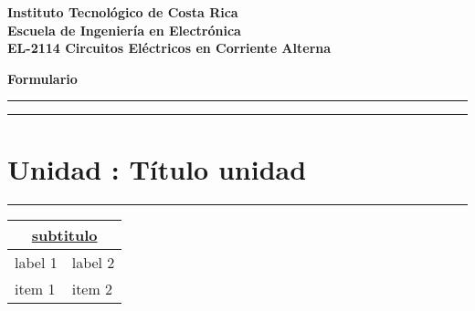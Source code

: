 \documentclass{article}
\begin{document}
\textbf{Instituto Tecnológico de Costa Rica \\
Escuela de Ingeniería en Electrónica \\
EL-2114 Circuitos Eléctricos en Corriente Alterna\\}
\begin{center}
\Huge
\textbf{Formulario}
\end{center}
\vspace{0.2in}
\hrule

\vspace{0.2in}
\hrule
\section{Unidad : Título unidad}
\hrule
\vspace{0.2in}
\begin{tabularx}{\textwidth}{|X|X|}
\hline
\multicolumn{2}{|c|}{\underline{\textbf{subtitulo}}} \\
\hline
  label 1 & label 2 \\
  \hline 
  item 1  & item 2  \\
  \hline
\end{tabularx}
\end{document}
